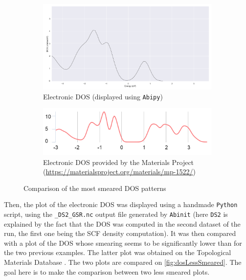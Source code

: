 \documentclass[11pt,a4paper]{article}
\begin{document}
\begin{figure}[H]
\centering
\begin{subfigure}[b]{0.95\textwidth}
\centering
\includegraphics[width=\textwidth]{images/dos1}
\caption{Electronic DOS (displayed using \texttt{Abipy})}
\label{fig:dos1}
\end{subfigure}

\begin{subfigure}[b]{0.95\textwidth}
\centering
\includegraphics[width=\textwidth]{images/dos4.png}
\caption{Electronic DOS provided by the Materials Project (\url{https://materialsproject.org/materials/mp-1522/})}
\label{fig:dos4}
\end{subfigure}
\caption{Comparison of the most smeared DOS patterns}
\label{fig:dosSmeared}
\end{figure}

Then, the plot of the electronic DOS was displayed using a handmade \texttt{Python} script, using the \texttt{\_DS2\_GSR.nc} output file generated by \texttt{Abinit} (here \texttt{DS2} is explained by the fact that the DOS was computed in the second dataset of the run, the first one being the SCF density computation). It was then compared with a plot of the DOS whose smearing seems to be significantly lower than for the two previous examples. The latter plot was obtained on the Topological Materials Database \cite{TMD1,TMD2,TMD3,TMD4,TMD5}.  The two plots are compared on \autoref{fig:dosLessSmeared}. The goal here is to make the comparison between two less smeared plots.
\end{document}
